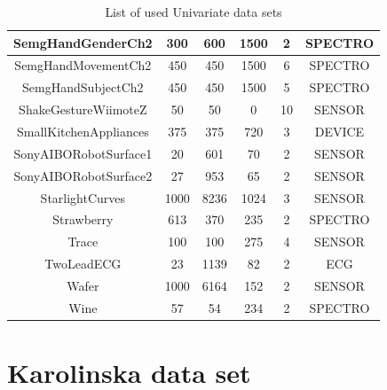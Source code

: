 \begin{table}
\begin{center}
\begin{longtable}{||c|c|c|c|c|c||}
 \hline
 SemgHandGenderCh2 & 300 & 600 & 1500 & 2 & SPECTRO \\[1ex]
 \hline
 SemgHandMovementCh2 & 450 & 450 & 1500 & 6 & SPECTRO \\[1ex]
 \hline
 SemgHandSubjectCh2 & 450 & 450 & 1500 & 5 & SPECTRO \\[1ex]
 \hline
 ShakeGestureWiimoteZ & 50 & 50 & 0 & 10 & SENSOR \\[1ex]
 \hline
 SmallKitchenAppliances & 375 & 375 & 720 & 3 & DEVICE \\[1ex]
 \hline
 SonyAIBORobotSurface1 & 20 & 601 & 70 & 2 & SENSOR \\[1ex]
 \hline
 SonyAIBORobotSurface2 & 27 & 953 & 65 & 2 & SENSOR \\[1ex]
 \hline
 StarlightCurves & 1000 & 8236 & 1024 & 3 & SENSOR \\[1ex]
 \hline
 Strawberry & 613 & 370 & 235 & 2 & SPECTRO \\[1ex]
 \hline
 Trace & 100 & 100 & 275 & 4 & SENSOR \\[1ex]
 \hline
 TwoLeadECG & 23 & 1139 & 82 & 2 & ECG \\[1ex]
 \hline
 Wafer & 1000 & 6164 & 152 & 2 & SENSOR \\[1ex]
 \hline
 Wine & 57 & 54 & 234 & 2 & SPECTRO
 \end{longtable}
\end{center}
\caption{List of used Univariate  data sets}
\label{table:Univariate}
\end{table}

\section{Karolinska  data set}
\label{Karolinska}